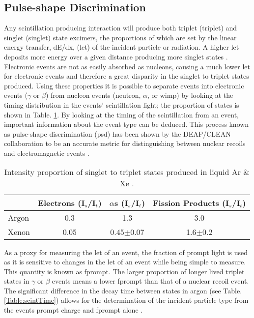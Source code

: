 \subsection{Pulse-shape Discrimination}
\label{sec:PSD}

Any scintillation producing interaction will produce both triplet (\gls{triplet}) and singlet (\gls{singlet}) state excimers, the proportions of which are set by the linear energy transfer, dE/dx, (\gls{let}) of the incident particle or radiation. A higher \gls{let} deposits more energy over a given distance producing more \gls{singlet} states \cite{LETArgonDependance}. Electronic events are not as easily absorbed as nucleons, causing a much lower \gls{let} for electronic events and therefore a great disparity in the \gls{singlet} to \gls{triplet} states produced. Using these properties it is possible to separate events into electronic events ($\gamma$ or $\beta$) from nucleon events (neutron, $\alpha$, or \gls{wimp}) by looking at the timing distribution in the events' scintillation light; the proportion of states is shown in Table. \ref{Table:singletTripletProportions}. By looking at the timing of the scintillation from an event, important information about the event type can be deduced. This process known as pulse-shape discrimination (\gls{psd}) has been shown by the DEAP/CLEAN collaboration to be an accurate metric for distinguishing between nuclear recoils and electromagnetic events \cite{2004BouleyPSD}.

\begin{table}
\centering
\caption{Intensity proportion of singlet to triplet states produced in liquid Ar $\&$Xe \cite{1983HitachiXenonAndArgonLuminesince}.}
\begin{tabular}{l	c	c	c}
\hline
\hline
&	Electrons (I$_s$/I$_t$)&	$\alpha$s (I$_s$/I$_t$)& 	Fission Products (I$_s$/I$_t$)\\
\hline
Argon&	0.3&	1.3&	3.0\\
Xenon&	0.05&	0.45$\pm$0.07&	1.6$\pm$0.2\\
\hline
\hline
\end{tabular}
\label{Table:singletTripletProportions}
\end{table}

As a proxy for measuring the \gls{let} of an event, the fraction of prompt light is used as it is sensitive to changes in the \gls{let} of an event while being simple to measure. This quantity is known as \gls{fprompt}. The larger proportion of longer lived \gls{triplet} states in $\gamma$ or $\beta$ events means a lower \gls{fprompt} than that of a nuclear recoil event. The significant difference in the decay time between states in argon (see Table. \ref{Table:scintTime}) allows for the determination of the incident particle type from the events prompt charge and \gls{fprompt} alone \cite{2004BouleyPSD}. 

